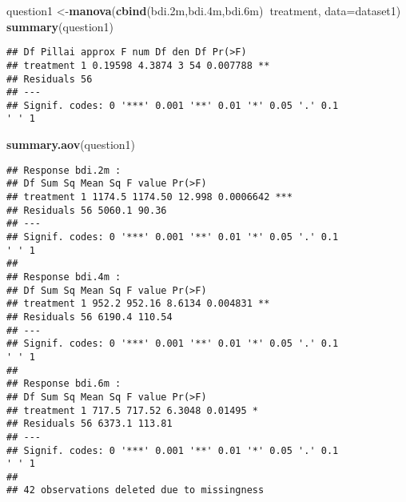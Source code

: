 \documentclass[
]{article}
\newenvironment{Shaded}{\begin{snugshade}}{\end{snugshade}}
\newcommand{\DataTypeTok}[1]{\textcolor[rgb]{0.13,0.29,0.53}{#1}}
\newcommand{\FloatTok}[1]{\textcolor[rgb]{0.00,0.00,0.81}{#1}}
\newcommand{\KeywordTok}[1]{\textcolor[rgb]{0.13,0.29,0.53}{\textbf{#1}}}
\newcommand{\NormalTok}[1]{#1}
\newcommand{\OperatorTok}[1]{\textcolor[rgb]{0.81,0.36,0.00}{\textbf{#1}}}
\begin{document}
\begin{Shaded}
\begin{Highlighting}[]
\NormalTok{question1 <-}\KeywordTok{manova}\NormalTok{(}\KeywordTok{cbind}\NormalTok{(bdi}\FloatTok{.2}\NormalTok{m,bdi}\FloatTok{.4}\NormalTok{m,bdi}\FloatTok{.6}\NormalTok{m)}\OperatorTok{~}\NormalTok{treatment, }\DataTypeTok{data=}\NormalTok{dataset1)}
\KeywordTok{summary}\NormalTok{(question1)}
\end{Highlighting}
\end{Shaded}

\begin{verbatim}
## Df Pillai approx F num Df den Df Pr(>F)
## treatment 1 0.19598 4.3874 3 54 0.007788 **
## Residuals 56
## ---
## Signif. codes: 0 '***' 0.001 '**' 0.01 '*' 0.05 '.' 0.1
' ' 1
\end{verbatim}

\begin{Shaded}
\begin{Highlighting}[]
\KeywordTok{summary.aov}\NormalTok{(question1)}
\end{Highlighting}
\end{Shaded}

\begin{verbatim}
## Response bdi.2m :
## Df Sum Sq Mean Sq F value Pr(>F)
## treatment 1 1174.5 1174.50 12.998 0.0006642 ***
## Residuals 56 5060.1 90.36
## ---
## Signif. codes: 0 '***' 0.001 '**' 0.01 '*' 0.05 '.' 0.1
' ' 1
##
## Response bdi.4m :
## Df Sum Sq Mean Sq F value Pr(>F)
## treatment 1 952.2 952.16 8.6134 0.004831 **
## Residuals 56 6190.4 110.54
## ---
## Signif. codes: 0 '***' 0.001 '**' 0.01 '*' 0.05 '.' 0.1
' ' 1
##
## Response bdi.6m :
## Df Sum Sq Mean Sq F value Pr(>F)
## treatment 1 717.5 717.52 6.3048 0.01495 *
## Residuals 56 6373.1 113.81
## ---
## Signif. codes: 0 '***' 0.001 '**' 0.01 '*' 0.05 '.' 0.1
' ' 1
##
## 42 observations deleted due to missingness
\end{verbatim}

\begin{Shaded}
\end{Shaded}
\end{document}
